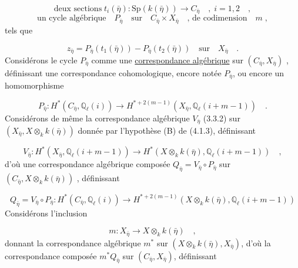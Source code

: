 
\begin{equation}\tag{4.4.3}
 \text{deux sections} \; t_{i}(\bar{\eta}) : \mathrm{Sp}(k(\bar{\eta})) \longrightarrow C_{\bar\eta} \quad , \; i=1,2 \quad ,
\end{equation}
\begin{equation}\tag{4.4.4}
\text{un cycle algébrique} \quad P_{\bar{\eta}} \quad \text{sur} \quad C_{\bar{\eta}} \times X_{\bar{\eta}} \quad \text{, de codimension} \quad m \; ,
\end{equation}
tels que

\begin{equation}\tag{4.4.5}
z_{\bar{\eta}} = P_{\bar{\eta}}(t_{1}(\bar{\eta})) - P_{\bar{\eta}}(t_{2}(\bar{\eta})) \quad \text{sur} \quad X_{\bar{\eta}} \quad .
\end{equation}
Considérons le cycle $P_{\bar{\eta}}$ comme une \underline{correspondance algébrique} sur $(C_{\bar{\eta}}, X_{\bar{\eta}})$ , définissant une correspondance cohomologique, encore notée $P_{\bar{\eta}}$, ou encore un homomorphisme

\begin{equation}\tag{4.4.6}
P_{\bar{\eta}} : H^{*}(C_{\bar{\eta}},\mathbb{Q}_{\ell}(i)) \longrightarrow H^{*+2(m-1)}(X_{\bar{\eta}}, \mathbb{Q}_{\ell}(i+m-1)) \quad .
\end{equation}
Considérons de même la correspondance algébrique $V_{\bar{\eta}}$ (3.3.2) sur $(X_{\bar{\eta}}, X \otimes_{k} k(\bar{\eta}))$ donnée par l'hypothèse (B) de (4.1.3), définissant

\begin{equation}\tag{4.4.7}
V_{\bar{\eta}} : H^{*}(X_{\bar{\eta}}, \mathbb{Q}_{\ell}(i+m-1)) \longrightarrow H^{*}(X\otimes_{k}k(\bar{\eta}), \mathbb{Q}_{\ell}(i+m-1)) \quad ,
\end{equation}
d'où une correspondance algébrique composée $Q_{\bar{\eta}} = V_{\bar{\eta}} \circ P_{\bar{\eta}}$ sur $(C_{\bar{\eta}}, X \otimes_{k} k(\bar{\eta}))$ , définissant

\begin{equation}\tag{4.4.8}
Q_{\bar{\eta}} = V_{\bar{\eta}} \circ P_{\bar{\eta}} : H^{*}(C_{\bar{\eta}},\mathbb{Q}_{\ell}(i)) \longrightarrow H^{*+2(m-1)}(X\otimes_{k}k(\bar{\eta}),\mathbb{Q}_{\ell}(i+m-1))
\end{equation}
Considérons l'inclusion

\begin{equation*}
m : X_{\bar{\eta}} \longrightarrow X \otimes_{k} k(\bar{\eta}) \quad ,
\end{equation*}
donnant la correspondance algébrique $m^{*}$ sur $(X \otimes_{k} k(\bar{\eta}), X_{\bar{\eta}})$, d'où la correspondance composée $m^{*} Q_{\bar{\eta}}$ sur $(C_{\bar{\eta}}, X_{\bar{\eta}})$, définissant 


